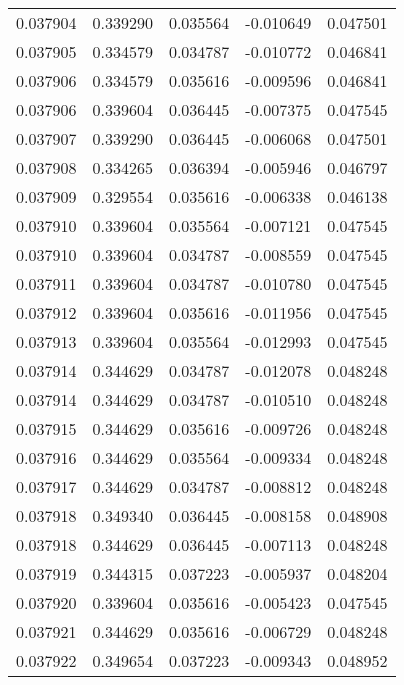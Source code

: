 \begin{tabular}{lrrrr}
0.037904    &  0.339290 &  0.035564 & -0.010649 &             0.047501 \\
0.037905    &  0.334579 &  0.034787 & -0.010772 &             0.046841 \\
0.037906    &  0.334579 &  0.035616 & -0.009596 &             0.046841 \\
0.037906    &  0.339604 &  0.036445 & -0.007375 &             0.047545 \\
0.037907    &  0.339290 &  0.036445 & -0.006068 &             0.047501 \\
0.037908    &  0.334265 &  0.036394 & -0.005946 &             0.046797 \\
0.037909    &  0.329554 &  0.035616 & -0.006338 &             0.046138 \\
0.037910    &  0.339604 &  0.035564 & -0.007121 &             0.047545 \\
0.037910    &  0.339604 &  0.034787 & -0.008559 &             0.047545 \\
0.037911    &  0.339604 &  0.034787 & -0.010780 &             0.047545 \\
0.037912    &  0.339604 &  0.035616 & -0.011956 &             0.047545 \\
0.037913    &  0.339604 &  0.035564 & -0.012993 &             0.047545 \\
0.037914    &  0.344629 &  0.034787 & -0.012078 &             0.048248 \\
0.037914    &  0.344629 &  0.034787 & -0.010510 &             0.048248 \\
0.037915    &  0.344629 &  0.035616 & -0.009726 &             0.048248 \\
0.037916    &  0.344629 &  0.035564 & -0.009334 &             0.048248 \\
0.037917    &  0.344629 &  0.034787 & -0.008812 &             0.048248 \\
0.037918    &  0.349340 &  0.036445 & -0.008158 &             0.048908 \\
0.037918    &  0.344629 &  0.036445 & -0.007113 &             0.048248 \\
0.037919    &  0.344315 &  0.037223 & -0.005937 &             0.048204 \\
0.037920    &  0.339604 &  0.035616 & -0.005423 &             0.047545 \\
0.037921    &  0.344629 &  0.035616 & -0.006729 &             0.048248 \\
0.037922    &  0.349654 &  0.037223 & -0.009343 &             0.048952 \\

\end{tabular}
